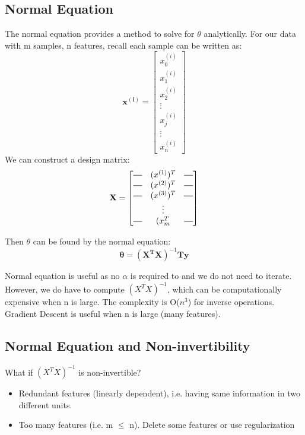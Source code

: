     \subsection{Normal Equation}

        The normal equation provides a method to solve for $\theta$ analytically. For our data with m samples, n features, recall each sample can be written as: 
       \[ 
        \mathbf{x^{(i)}} =  \begin{bmatrix}
            x_0^{(i)}\\
            x_1^{(i)} \\
            x_2^{(i)} \\
            \vdots \\
            x_j^{(i)}\\
           \vdots \\
           x_n^{(i)}
            \end{bmatrix}
        \]
        We can construct a design matrix:
        \begin{equation}
            \mathbf{X} = \begin{bmatrix}
                \horzbar & (x^{(1)})^T & \horzbar \\
                \horzbar & (x^{(2)})^T & \horzbar \\
                \horzbar & (x^{(3)})^T & \horzbar \\
                         & \vdots      &          \\
                \horzbar & (x_{m}^{T}  & \horzbar \\
             \end{bmatrix}
             \label{eq:design-matrix}
        \end{equation}


         Then $\theta$ can be found by the normal equation: 
                 \begin{equation}
                 \mathbf{\theta} = \mathbf{(X^TX)}^{-1}\mathbf{Ty}
                     \label{eq:normal}
                 \end{equation}

        
        Normal equation is useful as no $\alpha$ is required to and we do not need to iterate. However, we do have to compute $(X^TX)^{-1}$, which can be computationally expensive when n is large. The complexity is O($n^3$) for inverse operations. Gradient Descent is useful when n is large (many features). 

     \subsection{Normal Equation and Non-invertibility}

     What if $(X^TX)^{-1}$ is non-invertible? 

     \begin{itemize}
         \item Redundant features (linearly dependent), i.e. having same information in two different units.
         \item Too many features (i.e. m $\leq$ n). Delete some features or use regularization
     \end{itemize}



